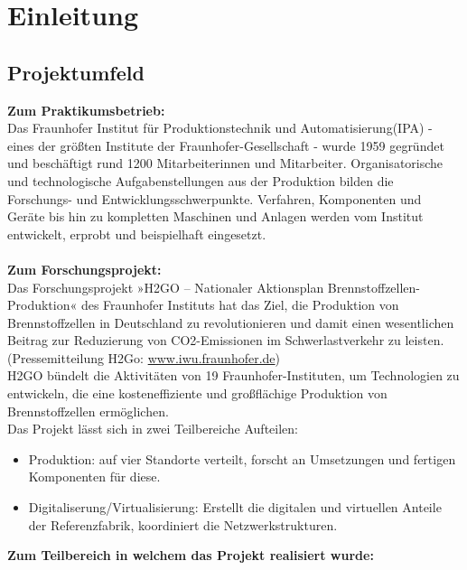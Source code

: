 \section{Einleitung}
\label{sec:Einleitung}


\subsection{Projektumfeld} 
\label{sec:Projektumfeld}
\textbf{Zum Praktikumsbetrieb:}\\
Das Fraunhofer Institut für Produktionstechnik und Automatisierung(IPA) - eines der größten Institute der Fraunhofer-Gesellschaft - wurde 1959 gegründet und beschäftigt rund 1200 Mitarbeiterinnen und Mitarbeiter. Organisatorische und technologische Aufgabenstellungen aus der Produktion bilden die Forschungs- und Entwicklungsschwerpunkte. Verfahren, Komponenten und Geräte bis hin zu kompletten Maschinen und Anlagen werden vom Institut entwickelt, erprobt und beispielhaft eingesetzt.\\
\\
\textbf{Zum Forschungsprojekt:}\\ Das Forschungsprojekt »H2GO – Nationaler Aktionsplan Brennstoffzellen-Produktion« des Fraunhofer Instituts hat das Ziel, die Produktion von Brennstoffzellen in Deutschland zu revolutionieren und damit einen wesentlichen Beitrag zur Reduzierung von CO2-Emissionen im Schwerlastverkehr zu leisten.\\
(Pressemitteilung H2Go: \href{https://www.iwu.fraunhofer.de/de/presse-und-medien/presseinformationen/PM-2022-ZV-Startschuss-fuer-das-Wasserstoffzeitalter-in-der-Lastenmobilitaet.html}{www.iwu.fraunhofer.de})\\
H2GO bündelt die Aktivitäten von 19 Fraunhofer-Instituten, um Technologien zu entwickeln, die eine kosteneffiziente und großflächige Produktion von Brennstoffzellen ermöglichen.\\
Das Projekt lässt sich in zwei Teilbereiche Aufteilen:
\begin{itemize}
	\item Produktion: auf vier Standorte verteilt, forscht an Umsetzungen und fertigen Komponenten für diese.
	\item Digitaliserung/Virtualisierung: Erstellt die digitalen und virtuellen Anteile der Referenzfabrik, koordiniert die Netzwerkstrukturen.
\end{itemize}
\textbf{Zum Teilbereich in welchem das Projekt realisiert wurde:}\\
